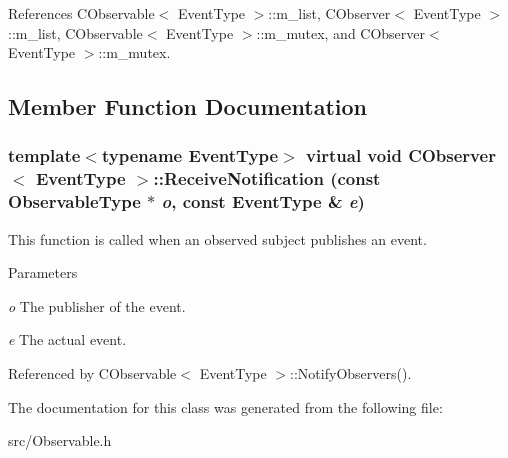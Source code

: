 References CObservable$<$ EventType $>$::m\_\-list, CObserver$<$ EventType $>$::m\_\-list, CObservable$<$ EventType $>$::m\_\-mutex, and CObserver$<$ EventType $>$::m\_\-mutex.

\subsection{Member Function Documentation}
\subsubsection[{ReceiveNotification}]{\setlength{\rightskip}{0pt plus 5cm}template$<$typename EventType$>$ virtual void {\bf CObserver}$<$ EventType $>$::ReceiveNotification (const {\bf ObservableType} $\ast$ {\em o}, \/  const EventType \& {\em e})\hspace{0.3cm}{\ttfamily  [protected, pure virtual]}}\label{classCObserver_a30fe2542f01b0c754fcba4461e4f3cfc}


This function is called when an observed subject publishes an event. 
\begin{DoxyParams}{Parameters}
\item[{\em o}]The publisher of the event. \item[{\em e}]The actual event. \end{DoxyParams}


Referenced by CObservable$<$ EventType $>$::NotifyObservers().

The documentation for this class was generated from the following file:\begin{DoxyCompactItemize}
\item 
src/Observable.h\end{DoxyCompactItemize}
